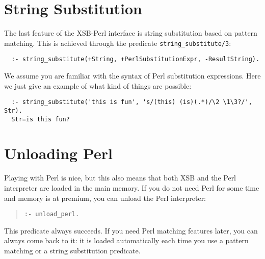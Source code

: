 \section{String Substitution}
The last feature of the XSB-Perl interface is string substitution based on
pattern matching. This is achieved through the predicate
{\tt string\_substitute/3}: 

\begin{verbatim}
  :- string_substitute(+String, +PerlSubstitutionExpr, -ResultString).
\end{verbatim}

We assume you are familiar with the syntax of Perl substitution
expressions. Here we just give an example of what kind of things are
possible:

\begin{verbatim}
  :- string_substitute('this is fun', 's/(this) (is)(.*)/\2 \1\3?/', Str).
  Str=is this fun?
\end{verbatim}

\section{Unloading Perl}
Playing with Perl is nice, but this also means that both XSB and the Perl
interpreter  are loaded in the main memory. If you do not need Perl
for some time and memory is at premium, you can unload the Perl
interpreter:
\begin{quote}
   {\tt :- unload\_perl. }
\end{quote}
This predicate always succeeds. If you need Perl matching features later,
you can always come back to it: it is loaded automatically each time you
use a pattern matching or a string substitution predicate.

